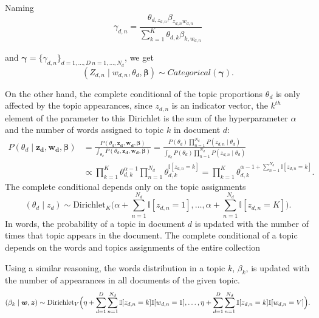 Naming 
\[
  \gamma_{d,n} = \frac{\theta_{d,z_{d,n}}\beta_{z_{d,n}w_{d,n}}}{\sum_{k=1}^K \theta_{d,k}\beta_{k,w_{d,n}}}
\] 

and \(\bm{\gamma} = \{\gamma_{d,n}\}_{d=1,\dots,D \ n=1,\dots,N_{d}}\), we get
\[
  (Z_{d,n} \mid w_{d,n}, \theta_{d}, \bm{\beta}) \sim Categorical(\bm{\gamma}).
\]

On the other hand, the complete conditional of the topic proportions \(\theta_{d}\) is only affected by the topic appearances, since \(z_{d,n}\) is an indicator vector, the \(k^{th}\) element of the parameter to this Dirichlet is the sum of the hyperparameter \(\alpha\) and the number of words assigned to topic \(k\) in document \(d\):
\[
  \begin{aligned}
    P(\theta_{d} \mid \bm{z_{d}},\bm{w_{d}}, \bm{\beta}) &= \frac{P(\theta_{d}, \bm{z_{d}}, \bm{w_{d}}, \bm{\beta})}{\int_{\theta_{d}} P(\theta_{d}, \bm{z_{d}}, \bm{w_{d}}, \bm{\beta})} = \frac{ P(\theta_{d})\prod_{n=1}^{N_{d}}P(z_{d,n}\mid \theta_{d}) }{ \int_{\theta_{d}}  P(\theta_{d})\prod_{n=1}^{N_{d}}P(z_{d,n}\mid \theta_{d})  }\\
    &\propto \prod_{k=1}^{K}\theta_{d,k}^{\alpha-1} \prod_{n=1}^{N_{d}}\theta_{d,k}^{\mathbb{I}[z_{d,n}=k]} = \prod_{k=1}^{K}\theta_{d,k}^{\alpha -1 + \sum_{n=1}^{N_{d}} \mathbb{I}[z_{d,n}=k] }.
  \end{aligned}
\]
The complete conditional depends only on the topic assignments
\[
  (\theta_{d} \mid z_{d}) \sim \text{Dirichlet}_{K}\Big(\alpha + \sum_{n=1}^{N_{d}} \mathbb{I}[z_{d,n}=1],\dots, \alpha + \sum_{n=1}^{N_{d}} \mathbb{I}[z_{d,n}=K]\Big).
\]
In words, the probability of a topic in document \(d\) is updated with the number of times that topic appears in the document. The complete conditional of a topic depends on the words and topics assignments of the entire collection

Using a similar reasoning, the words distribution in a topic \(k\), \(\beta_{k}\), is updated with the number of appearances in all documents of the given topic.
\[
  (\beta_{k} \mid \bm{w}, \bm{z}) \sim \text{Dirichlet}_{V}\Big(\eta + \sum_{d=1}^{D}\sum_{n=1}^{N_{d}}\mathbb{I}[z_{d,n} = k]\mathbb{I}[w_{d,n} = 1], \dots, \eta + \sum_{d=1}^{D}\sum_{n=1}^{N_{d}}\mathbb{I}[z_{d,n} = k]\mathbb{I}[w_{d,n} = V]\Big).
\]
